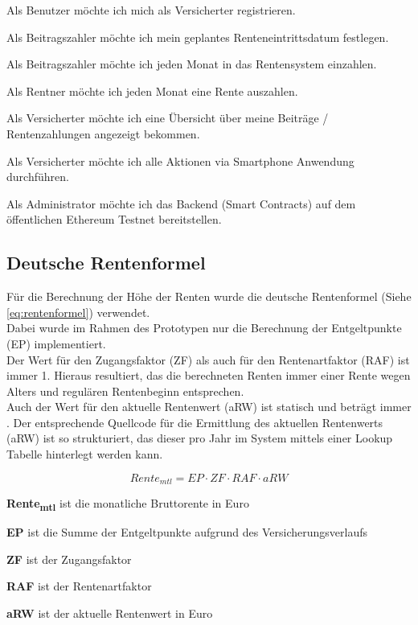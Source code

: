 \begin{compactenum}
\item Als Benutzer möchte ich mich als Versicherter registrieren.
\item Als Beitragszahler möchte ich mein geplantes Renteneintrittsdatum festlegen.
\item Als Beitragszahler möchte ich jeden Monat in das Rentensystem einzahlen.
\item Als Rentner möchte ich jeden Monat eine Rente auszahlen.
\item Als Versicherter möchte ich eine Übersicht über meine Beiträge / Rentenzahlungen angezeigt bekommen.
\item Als Versicherter möchte ich alle Aktionen via Smartphone Anwendung durchführen.
\item Als Administrator möchte ich das Backend (Smart Contracts) auf dem öffentlichen Ethereum Testnet bereitstellen.
\end{compactenum}


\subsection{Deutsche Rentenformel}
Für die Berechnung der Höhe der Renten wurde die deutsche Rentenformel (Siehe \ref{eq:rentenformel}) verwendet.
\\
Dabei wurde im Rahmen des Prototypen nur die Berechnung der Entgeltpunkte (EP) implementiert. 
\\
Der Wert für den Zugangsfaktor (ZF) als auch für den Rentenartfaktor (RAF) ist immer 1. Hieraus resultiert, das die berechneten Renten immer einer Rente wegen Alters und regulären Rentenbeginn entsprechen.
\\
Auch der Wert für den aktuelle Rentenwert (aRW) ist statisch und beträgt immer . Der entsprechende Quellcode für die Ermittlung des aktuellen Rentenwerts (aRW) ist so strukturiert, das dieser pro Jahr im System mittels einer Lookup Tabelle hinterlegt werden kann.

\begin{equation*} \label{eq:rentenformel}
Rente_{mtl} = EP \cdot ZF \cdot RAF \cdot aRW
\end{equation*}

\begin{compactitem}
\item \textbf{Rente\textsubscript{mtl}} ist die monatliche Bruttorente in Euro
\item \textbf{EP} ist die Summe der Entgeltpunkte aufgrund des Versicherungsverlaufs
\item \textbf{ZF} ist der Zugangsfaktor
\item \textbf{RAF} ist der Rentenartfaktor
\item \textbf{aRW} ist der aktuelle Rentenwert in Euro
\end{compactitem}


